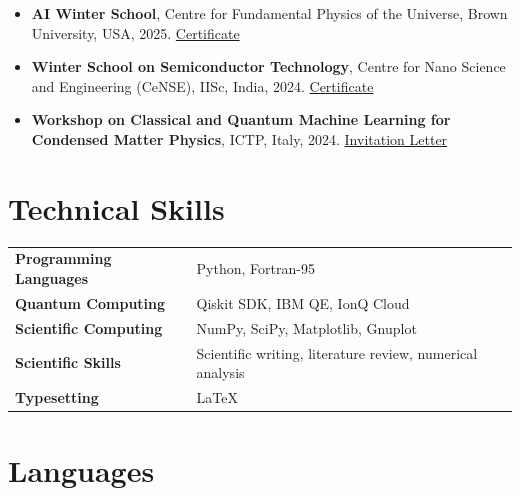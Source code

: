\documentclass[11pt,a4paper]{article}
\begin{document}
\begin{itemize}
    \item \textbf{AI Winter School}, Centre for Fundamental Physics of the Universe, Brown University, USA, 2025. \href{https://drive.google.com/file/d/1ORo3sxO7IakUHW4bqKJBtPJqxbwnikIp/view}{Certificate}
    \item \textbf{Winter School on Semiconductor Technology},
    Centre for Nano Science and Engineering (CeNSE), IISc, India, 2024. \href{https://drive.google.com/file/d/1SZiUrxu9o2Ie2XDfJy9m4O4ctlaH4kSJ/view}{Certificate}

    \item \textbf{Workshop on Classical and Quantum Machine Learning for Condensed Matter Physics}, ICTP, Italy, 2024. \href{https://drive.google.com/file/d/1ERSvCGcr1wE6zF4m50vy1_SHyIbEuXgu/view}{Invitation Letter}

\end{itemize}

\section{Technical Skills}

\begin{tabularx}{\textwidth}{@{}>{\bfseries}p{3.0cm}X@{}}

Programming Languages &
Python, Fortran-95 \\[3pt]

Quantum Computing &
Qiskit SDK, IBM QE, IonQ Cloud \\[3pt]

Scientific Computing &
NumPy, SciPy, Matplotlib, Gnuplot \\[3pt]

Scientific Skills &
Scientific writing, literature review, numerical analysis \\[3pt]

Typesetting &
LaTeX \\

\end{tabularx}



\section{Languages}
\end{document}

